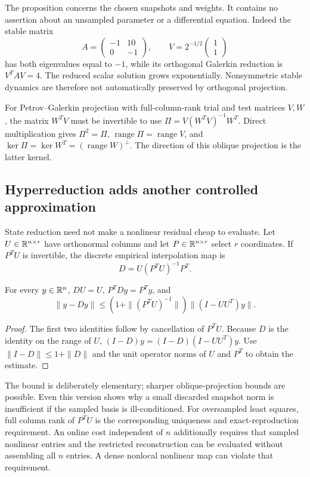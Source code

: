 The proposition concerns the chosen snapshots and weights.  It contains
no assertion about an unsampled parameter or a differential equation.
Indeed the stable matrix
\[
 A=\begin{pmatrix}-1&10\\0&-1\end{pmatrix},\qquad
 V=2^{-1/2}\begin{pmatrix}1\\1\end{pmatrix}
\]
has both eigenvalues equal to $-1$, while its orthogonal Galerkin
reduction is $V^TAV=4$.  The reduced scalar solution grows
exponentially.  Nonsymmetric stable dynamics are therefore not
automatically preserved by orthogonal projection.

For Petrov--Galerkin projection with full-column-rank trial and test
matrices $V,W$, the matrix $W^TV$ must be invertible to use
$\Pi=V(W^TV)^{-1}W^T$.  Direct multiplication gives
$\Pi^2=\Pi$, $\operatorname{range}\Pi=\operatorname{range}V$,
and $\ker\Pi=\ker W^T=(\operatorname{range}W)^\perp$.
The direction of this oblique projection is the latter kernel.

\subsection{Hyperreduction adds another controlled approximation}

State reduction need not make a nonlinear residual cheap to evaluate.
Let $U\in\mathbb{R}^{n\times r}$ have orthonormal columns and let
$P\in\mathbb{R}^{n\times r}$ select $r$ coordinates.  If
$P^TU$ is invertible, the discrete empirical interpolation map is
\[
 D=U(P^TU)^{-1}P^T.
\]

\begin{proposition}
\label{prop:micro-deim}
For every $y\in\mathbb{R}^n$, $DU=U$, $P^TDy=P^Ty$, and
\[
 \|y-Dy\|
 \le\left(1+\|(P^TU)^{-1}\|\right)
       \|(I-UU^T)y\|.
\]
\end{proposition}
\begin{proof}
The first two identities follow by cancellation of $P^TU$.
Because $D$ is the identity on the range of $U$,
$(I-D)y=(I-D)(I-UU^T)y$.
Use $\|I-D\|\le1+\|D\|$ and the unit operator norms
of $U$ and $P^T$ to obtain the estimate.
\end{proof}

The bound is deliberately elementary; sharper oblique-projection
bounds are possible.  Even this version shows why a small discarded
snapshot norm is insufficient if the sampled basis is ill-conditioned.
For oversampled least squares, full column rank of $P^TU$ is the
corresponding uniqueness and exact-reproduction requirement.
An online cost independent of $n$ additionally requires that sampled
nonlinear entries and the restricted reconstruction can be evaluated
without assembling all $n$ entries.  A dense nonlocal nonlinear map
can violate that requirement.

